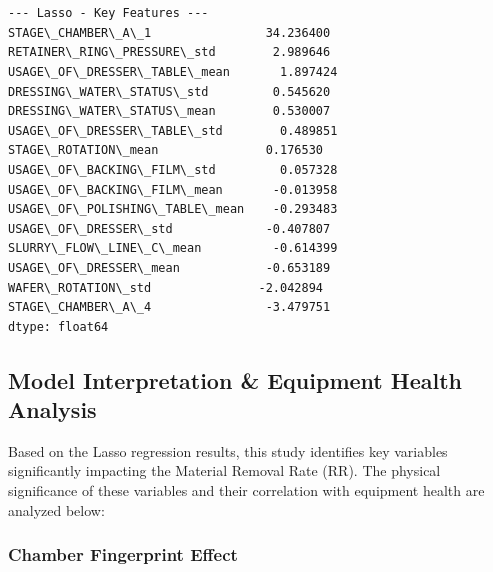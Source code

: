 \documentclass[11pt]{article}
\begin{document}
    \begin{center}
    \end{center}
    { \hspace*{\fill} \\}
    
    \begin{center}
    \end{center}
    { \hspace*{\fill} \\}
    
    \begin{Verbatim}[commandchars=\\\{\}]
--- Lasso - Key Features ---
STAGE\_CHAMBER\_A\_1                34.236400
RETAINER\_RING\_PRESSURE\_std        2.989646
USAGE\_OF\_DRESSER\_TABLE\_mean       1.897424
DRESSING\_WATER\_STATUS\_std         0.545620
DRESSING\_WATER\_STATUS\_mean        0.530007
USAGE\_OF\_DRESSER\_TABLE\_std        0.489851
STAGE\_ROTATION\_mean               0.176530
USAGE\_OF\_BACKING\_FILM\_std         0.057328
USAGE\_OF\_BACKING\_FILM\_mean       -0.013958
USAGE\_OF\_POLISHING\_TABLE\_mean    -0.293483
USAGE\_OF\_DRESSER\_std             -0.407807
SLURRY\_FLOW\_LINE\_C\_mean          -0.614399
USAGE\_OF\_DRESSER\_mean            -0.653189
WAFER\_ROTATION\_std               -2.042894
STAGE\_CHAMBER\_A\_4                -3.479751
dtype: float64
    \end{Verbatim}

    \subsection{Model Interpretation \& Equipment Health
Analysis}\label{model-interpretation-equipment-health-analysis}

Based on the Lasso regression results, this study identifies key
variables significantly impacting the Material Removal Rate (RR). The
physical significance of these variables and their correlation with
equipment health are analyzed below:

\subsubsection{Chamber Fingerprint
Effect}\label{chamber-fingerprint-effect}
\end{document}

